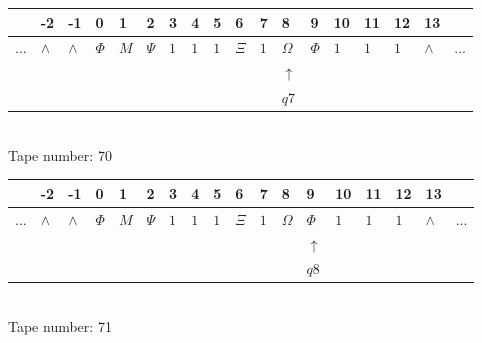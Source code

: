 \documentclass[11pt]{article}
\begin{document}
\begin{table}[H]
\centering
\begin{tabular}{llllllllllllllllll}
 & -2 & -1 & 0 & 1 & 2 & 3 & 4 & 5 & 6 & 7 & 8 & 9 & 10 & 11 & 12 & 13 & \\
\hline
$...$ & \multicolumn{1}{|l|}{$\wedge$} & \multicolumn{1}{|l|}{$\wedge$} & \multicolumn{1}{|l|}{$\Phi$} & \multicolumn{1}{|l|}{$M$} & \multicolumn{1}{|l|}{$\Psi$} & \multicolumn{1}{|l|}{$1$} & \multicolumn{1}{|l|}{$1$} & \multicolumn{1}{|l|}{$1$} & \multicolumn{1}{|l|}{$\Xi$} & \multicolumn{1}{|l|}{$1$} & \multicolumn{1}{|l|}{$\Omega$} & \multicolumn{1}{|l|}{$\Phi$} & \multicolumn{1}{|l|}{$1$} & \multicolumn{1}{|l|}{$1$} & \multicolumn{1}{|l|}{$1$} & \multicolumn{1}{|l|}{$\wedge$} & $...$\\
\hline
&  &  &  &  &  &  &  &  &  &  & $\uparrow$ &  &  &  &  &  &  \\
&  &  &  &  &  &  &  &  &  &  & $ q7 $ &  &  &  &  &  &  \\
\end{tabular}
\\
Tape number: 70
\noindent\makebox[\linewidth]{\hdashrule{\textwidth}{1pt}{1pt}}\end{table}

\begin{table}[H]
\centering
\begin{tabular}{llllllllllllllllll}
 & -2 & -1 & 0 & 1 & 2 & 3 & 4 & 5 & 6 & 7 & 8 & 9 & 10 & 11 & 12 & 13 & \\
\hline
$...$ & \multicolumn{1}{|l|}{$\wedge$} & \multicolumn{1}{|l|}{$\wedge$} & \multicolumn{1}{|l|}{$\Phi$} & \multicolumn{1}{|l|}{$M$} & \multicolumn{1}{|l|}{$\Psi$} & \multicolumn{1}{|l|}{$1$} & \multicolumn{1}{|l|}{$1$} & \multicolumn{1}{|l|}{$1$} & \multicolumn{1}{|l|}{$\Xi$} & \multicolumn{1}{|l|}{$1$} & \multicolumn{1}{|l|}{$\Omega$} & \multicolumn{1}{|l|}{$\Phi$} & \multicolumn{1}{|l|}{$1$} & \multicolumn{1}{|l|}{$1$} & \multicolumn{1}{|l|}{$1$} & \multicolumn{1}{|l|}{$\wedge$} & $...$\\
\hline
&  &  &  &  &  &  &  &  &  &  &  & $\uparrow$ &  &  &  &  &  \\
&  &  &  &  &  &  &  &  &  &  &  & $ q8 $ &  &  &  &  &  \\
\end{tabular}
\\
Tape number: 71
\noindent\makebox[\linewidth]{\hdashrule{\textwidth}{1pt}{1pt}}\end{table}
\clearpage
\end{document}
